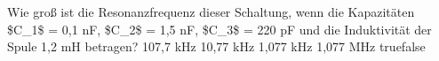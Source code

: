     {Wie groß ist die Resonanzfrequenz dieser Schaltung, wenn die Kapazitäten \$C\_1\$ = 0,1 nF, \$C\_2\$ = 1,5 nF, \$C\_3\$ = 220 pF und die Induktivität der Spule 1,2 mH betragen?}
    {107,7 kHz}
    {10,77 kHz}
    {1,077 kHz}
    {1,077 MHz}
    {true}{false}